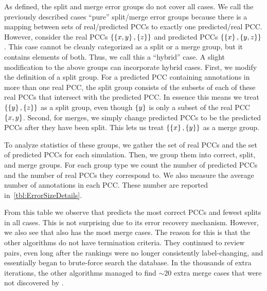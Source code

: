     As defined, the split and merge error groups do not cover all cases.
    We call the previously described cases ``pure'' split/merge error groups because there is a mapping between
      sets of real/predicted PCCs to exactly one predicted/real PCC.
    However, consider the real PCCs $\left\{\left\{x, y\right\}, \left\{z\right\}\right\}$ and predicted PCCs $\left\{\left\{x\right\},
      \left\{y, z\right\}\right\}$.
    This case cannot be cleanly categorized as a split or a merge group, but it contains elements of both.
    Thus, we call this a ``hybrid'' case.
    A slight modification to the above groups can incorporate hybrid cases.
    First, we modify the definition of a split group.
    For a predicted PCC containing annotations in more than one real PCC, the split group consists of the subsets
      of each of these real PCCs that intersect with the predicted PCC.
    In essence this means we treat $\left\{\left\{y\right\}, \left\{z\right\}\right\}$ as a split group, even though $\left\{y\right\}$ is
      only a subset of the real PCC $\left\{x, y\right\}$.
    Second, for merges, we simply change predicted PCCs to be the predicted PCCs after they have been split.
    This lets us treat $\left\{\left\{x\right\}, \left\{y\right\}\right\}$ as a merge group.


    To analyze statistics of these groups, we gather the set of real PCCs and the set of predicted PCCs for each
      simulation.
    Then, we group them into correct, split, and merge groups.
    For each group type we count the number of predicted PCCs and the number of real PCCs they correspond to.
    We also measure the average number of annotations in each PCC.
    These number are reported in~\cref{tbl:ErrorSizeDetails}.

    From this table we observe that  predicts the most correct PCCs and fewest splits in all cases.
    This is not surprising due to its error recovery mechanism.
    However, we also see that  also has the most merge cases.
    The reason for this is that the other algorithms do not have termination criteria.
    They continued to review pairs, even long after the rankings were no longer consistently label-changing, and
      essentially began to brute-force search the database.
    In the thousands of extra iterations, the other algorithms managed to find ${\sim}20$ extra merge cases that
      were not discovered by .

